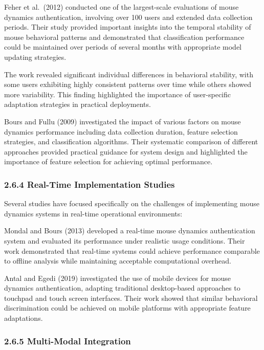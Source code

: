 \documentclass[
  11pt,
  a4paper,
]{article}
\begin{document}
Feher et al.~(2012) conducted one of the largest-scale evaluations of
mouse dynamics authentication, involving over 100 users and extended
data collection periods. Their study provided important insights into
the temporal stability of mouse behavioral patterns and demonstrated
that classification performance could be maintained over periods of
several months with appropriate model updating strategies.

The work revealed significant individual differences in behavioral
stability, with some users exhibiting highly consistent patterns over
time while others showed more variability. This finding highlighted the
importance of user-specific adaptation strategies in practical
deployments.

Bours and Fullu (2009) investigated the impact of various factors on
mouse dynamics performance including data collection duration, feature
selection strategies, and classification algorithms. Their systematic
comparison of different approaches provided practical guidance for
system design and highlighted the importance of feature selection for
achieving optimal performance.

\subsubsection{2.6.4 Real-Time Implementation
Studies}\label{real-time-implementation-studies}

Several studies have focused specifically on the challenges of
implementing mouse dynamics systems in real-time operational
environments:

Mondal and Bours (2013) developed a real-time mouse dynamics
authentication system and evaluated its performance under realistic
usage conditions. Their work demonstrated that real-time systems could
achieve performance comparable to offline analysis while maintaining
acceptable computational overhead.

Antal and Egedi (2019) investigated the use of mobile devices for mouse
dynamics authentication, adapting traditional desktop-based approaches
to touchpad and touch screen interfaces. Their work showed that similar
behavioral discrimination could be achieved on mobile platforms with
appropriate feature adaptations.

\subsubsection{2.6.5 Multi-Modal
Integration}\label{multi-modal-integration}
\end{document}
